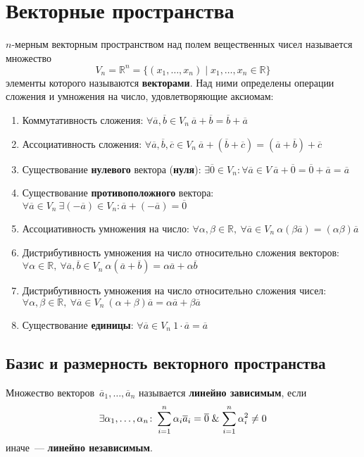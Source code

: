\section{Векторные пространства}
 $n$\nobreakdash-мерным векторным пространством над полем вещественных чисел называется множество
\begin{equation*}
V_n = \mathbb R^n = \{ (x_1, \ldots, x_n) \mid x_1, \ldots, x_n \in \mathbb R \}
\end{equation*}
элементы которого называются \textbf{векторами}. Над ними определены операции сложения и умножения на число, удовлетворяющие аксиомам:
\begin{enumerate}
	\item Коммутативность сложения: $\forall \overline a, \overline b \in V_n \
	\overline a + \overline b = \overline b + \overline a$
	\item Ассоциативность сложения: $\forall \overline a, \overline b, \overline c \in V_n \
	\overline a + (\overline b + \overline c) = (\overline a + \overline b) + \overline c$
	\item Существование \textbf{нулевого} вектора (\textbf{нуля}): $\exists \overline 0 \in V_n \colon \forall \overline a \in V \
	\overline a + \overline 0 = \overline 0 + \overline a = \overline a$
	\item Существование \textbf{противоположного} вектора: $\forall \overline a \in V_n \
	\exists (-\overline a) \in V_n \colon
	\overline a + (-\overline a) = \overline 0$
	\item Ассоциативность умножения на число: $\forall \alpha, \beta \in \mathbb R, \
	\forall \overline a \in V_n \
	\alpha (\beta \overline a) = (\alpha \beta) \overline a$
	\item Дистрибутивность умножения на число относительно сложения векторов: $\forall \alpha \in \mathbb R, \
	\forall \overline a, \overline b \in V_n \
	\alpha (\overline a + \overline b) = \alpha \overline a + \alpha \overline b$
	\item Дистрибутивность умножения на число относительно сложения чисел: $\forall \alpha, \beta \in \mathbb R, \
	\forall \overline a \in V_n \
	(\alpha + \beta) \overline a = \alpha \overline a + \beta \overline a$
	\item Существование \textbf{единицы}: $\forall \overline a \in V_n \
	1 \cdot \overline a = \overline a$
\end{enumerate}

\subsection{Базис и размерность векторного пространства}
Множество векторов~$\overline a_1, \ldots, \overline a_n$ называется \textbf{линейно зависимым}, если
\begin{equation*}
\exists \alpha_1, \ldots, \alpha_n \colon
\sum_{i=1}^n \alpha_i \overline a_i = \overline 0 \mathrel{\&}
\sum_{i=1}^n \alpha_i^2 \neq 0
\end{equation*}
иначе~--- \textbf{линейно независимым}.

